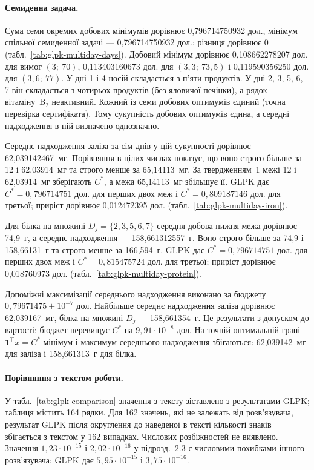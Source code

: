 \paragraph{Семиденна задача.}
Сума семи окремих добових мінімумів дорівнює 0{,}796714750932 дол., мінімум спільної семиденної задачі --- 0{,}796714750932 дол.; різниця дорівнює $0$ (табл.~\ref{tab:glpk-multiday-days}). Добовий мінімум дорівнює 0{,}108662278207 дол. для вимог $(3;\ 70)$, 0{,}113403160673 дол. для $(3{,}3;\ 73{,}5)$ і 0{,}119590356250 дол. для $(3{,}6;\ 77)$. У дні 1 і 4 носій складається з п’яти продуктів. У дні 2, 3, 5, 6, 7 він складається з чотирьох продуктів (без яловичої печінки), а рядок вітаміну~B$_2$ неактивний. Кожний із семи добових оптимумів єдиний (точна перевірка сертифіката). Тому сукупність добових оптимумів єдина, а середні надходження в ній визначено однозначно.

Середнє надходження заліза за сім днів у цій сукупності дорівнює 62{,}039142467~мг. Порівняння в цілих числах показує, що воно строго більше за 12 і 62{,}03914~мг та строго менше за 65{,}14113~мг. За твердженням~1 межі 12 і 62{,}03914~мг зберігають $C^*$, а межа 65{,}14113~мг збільшує її. GLPK дає $C^*=0{,}796714751$ дол. для перших двох меж і $C^*=0{,}809187146$ дол. для третьої; приріст дорівнює 0{,}012472395 дол. (табл.~\ref{tab:glpk-multiday-iron}).

Для білка на множині $D_j=\{2,3,5,6,7\}$ середня добова нижня межа дорівнює 74{,}9~г, а середнє надходження --- 158{,}661312557~г. Воно строго більше за 74{,}9 і 158{,}66131~г та строго менше за 166{,}594~г. GLPK дає $C^*=0{,}796714751$ дол. для перших двох меж і $C^*=0{,}815475724$ дол. для третьої; приріст дорівнює 0{,}018760973 дол. (табл.~\ref{tab:glpk-multiday-protein}).

Допоміжні максимізації середнього надходження виконано за бюджету $0{,}79671475+10^{-7}$ дол. Найбільше середнє надходження заліза дорівнює 62{,}039167~мг, білка на множині $D_j$ --- 158{,}661354~г. Це результати з допуском до вартості: бюджет перевищує $C^*$ на $9{,}91\cdot10^{-8}$ дол. На точній оптимальній грані $\mathbf1^\top x=C^*$ мінімум і максимум середнього надходження збігаються: 62{,}039142~мг для заліза і 158{,}661313~г для білка.

\paragraph{Порівняння з текстом роботи.}
У табл.~\ref{tab:glpk-comparison} значення з тексту зіставлено з результатами GLPK; таблиця містить 164 рядки. Для 162 значень, які не залежать від розв’язувача, результат GLPK після округлення до наведеної в тексті кількості знаків збігається з текстом у 162 випадках. Числових розбіжностей не виявлено. Значення $1{,}23\cdot10^{-15}$ і $2{,}02\cdot10^{-16}$ у підрозд.~2.3 є числовими похибками іншого розв’язувача; GLPK дає $5{,}95\cdot10^{-15}$ і $3{,}75\cdot10^{-16}$.

